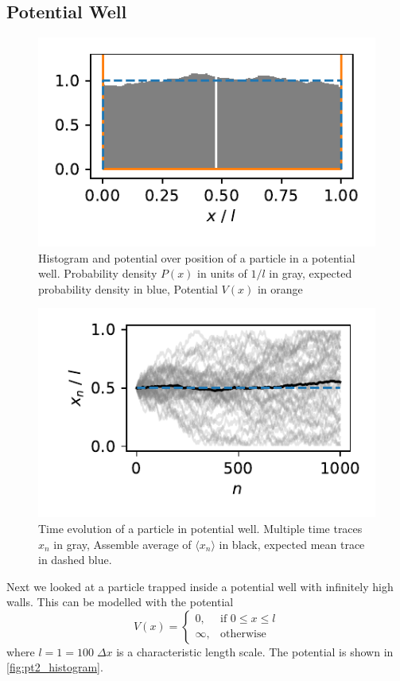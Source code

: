 \documentclass[
    parskip=half, 
    twoside=false,
    twocolumn=true,
    fontsize=11pt,
]{scrarticle}
\begin{document}
\subsection{Potential Well}
\begin{figure}
    \centering
    \includegraphics{figures/02 histogram.pdf}
    \caption{
        Histogram and potential over position of a particle in a potential well.
        Probability density $P(x)$ in units of $1/l$ in gray, expected probability density in blue, Potential $V(x)$ in orange
    }
    \label{fig:pt2_histogram}
\end{figure}
\begin{figure}
    \centering
    \includegraphics{figures/02 time evolution.pdf}
    \caption{
        Time evolution of a particle in potential well.
        Multiple time traces $x_n$ in gray, Assemble average of $\langle x_n\rangle$ in black, expected mean trace in dashed blue.
    }
    \label{fig:pt2_trajectory}
\end{figure}

Next we looked at a particle trapped inside a potential well with infinitely high walls.
This can be modelled with the potential
$$
V(x) = \begin{cases}
    0, &\text{if } 0\leq x\leq l\\
    \infty, &\text{otherwise}
\end{cases}
$$
where $l=1=100\;\Delta x$ is a characteristic length scale.
The potential is shown in \autoref{fig:pt2_histogram}.
\end{document}
